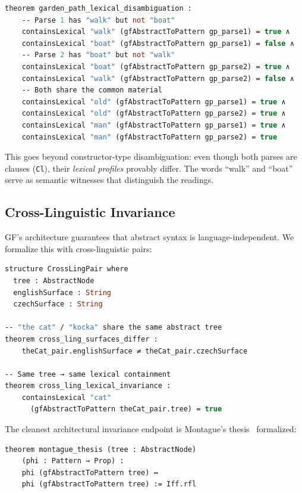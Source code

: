 \documentclass[11pt]{article}
\newcommand{\code}[1]{\texttt{#1}}
\newcommand{\GF}{\textup{GF}}
\begin{document}
\begin{lstlisting}[language=ml,caption={Garden-path lexical disambiguation}]
theorem garden_path_lexical_disambiguation :
    -- Parse 1 has "walk" but not "boat"
    containsLexical "walk" (gfAbstractToPattern gp_parse1) = true ∧
    containsLexical "boat" (gfAbstractToPattern gp_parse1) = false ∧
    -- Parse 2 has "boat" but not "walk"
    containsLexical "boat" (gfAbstractToPattern gp_parse2) = true ∧
    containsLexical "walk" (gfAbstractToPattern gp_parse2) = false ∧
    -- Both share the common material
    containsLexical "old" (gfAbstractToPattern gp_parse1) = true ∧
    containsLexical "old" (gfAbstractToPattern gp_parse2) = true ∧
    containsLexical "man" (gfAbstractToPattern gp_parse1) = true ∧
    containsLexical "man" (gfAbstractToPattern gp_parse2) = true
\end{lstlisting}

This goes beyond constructor-type disambiguation: even though both parses
are clauses (\code{Cl}), their \emph{lexical profiles} provably differ.
The words ``walk'' and ``boat'' serve as semantic witnesses that distinguish
the readings.

\subsection{Cross-Linguistic Invariance}

\GF{}'s architecture guarantees that abstract syntax is language-independent.
We formalize this with cross-linguistic pairs:

\begin{lstlisting}[language=ml,caption={Cross-linguistic invariance}]
structure CrossLingPair where
  tree : AbstractNode
  englishSurface : String
  czechSurface : String

-- "the cat" / "kocka" share the same abstract tree
theorem cross_ling_surfaces_differ :
    theCat_pair.englishSurface ≠ theCat_pair.czechSurface

-- Same tree → same lexical containment
theorem cross_ling_lexical_invariance :
    containsLexical "cat"
      (gfAbstractToPattern theCat_pair.tree) = true
\end{lstlisting}

The cleanest architectural invariance endpoint is Montague's
thesis~\cite{Montague1973} formalized:

\begin{lstlisting}[language=ml]
theorem montague_thesis (tree : AbstractNode)
    (phi : Pattern → Prop) :
    phi (gfAbstractToPattern tree) ↔
    phi (gfAbstractToPattern tree) := Iff.rfl
\end{lstlisting}
\end{document}

